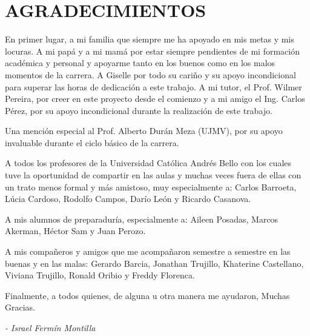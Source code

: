 \chapter*{AGRADECIMIENTOS}

En primer lugar, a mi familia que siempre me ha apoyado en mis metas y mis locuras. A mi papá y a mi mamá por estar siempre pendientes de mi formación académica y personal y apoyarme tanto en los buenos como en los malos momentos de la carrera. A Giselle por todo su cariño y su apoyo incondicional para superar las horas de dedicación a este trabajo. A mi tutor, el Prof. Wilmer Pereira, por creer en este proyecto desde el comienzo y a mi amigo el Ing. Carlos Pérez, por su apoyo incondicional durante la realización de este trabajo.

Una mención especial al Prof. Alberto Durán Meza (UJMV), por su apoyo invaluable durante el ciclo básico de la carrera.

A todos los profesores de la Universidad Católica Andrés Bello con los cuales tuve la oportunidad de compartir en las aulas y muchas veces fuera de ellas con un trato menos formal y más amistoso, muy especialmente a: Carlos Barroeta, Lúcia Cardoso, Rodolfo Campos, Darío León y Ricardo Casanova. 

A mis alumnos de preparaduría, especialmente a: Aileen Posadas, Marcos Akerman, Héctor Sam y Juan Perozo.

A mis compañeros y amigos que me acompañaron semestre a semestre en las buenas y en las malas: Gerardo Barcia, Jonathan Trujillo, Khaterine Castellano, Viviana Trujillo, Ronald Oribio y Freddy Florenca.

Finalmente, a todos quienes, de alguna u otra manera me ayudaron,
Muchas Gracias.

\begin{flushright}
\textit{- Israel Fermín Montilla}
\end{flushright}
